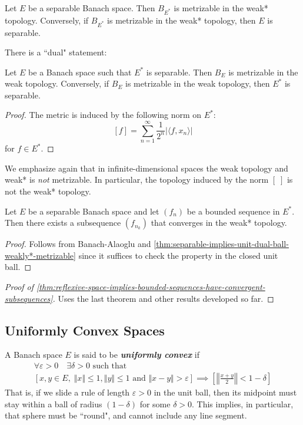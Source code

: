 \documentclass{article}
\theoremstyle{definition}
\numberwithin{equation}{section}
\begin{document}
	\begin{thm}\label{thm:separable-implies-unit-dual-ball-weakly*-metrizable}
		Let $E$ be a separable Banach space. Then $B_{E^*}$ is metrizable in the weak* topology. Conversely, if $B_{E^*}$ is metrizable in the weak* topology, then $E$ is separable.
	\end{thm}
	There is a ``dual" statement:
	\begin{thm}
		Let $E$ be a Banach space such that $E^*$ is separable. Then $B_E$ is metrizable in the weak topology. Conversely, if $B_E$ is metrizable in the weak topology,  then $E^*$ is separable.
	\end{thm}
	\begin{proof}
		The metric is induced by the following norm on $E^*$:
		\[[f]=\sum_{n=1}^\infty\frac{1}{2^n}|\langle f,x_n\rangle|\]
		for $f\in E^*$.
	\end{proof}
	\begin{remark}
		We emphasize again that in infinite-dimensional spaces the weak topology and weak* is \textit{not} metrizable. In particular, the topology induced by the norm $[\;]$ is not the weak* topology.
	\end{remark}
	\begin{coro}
		Let $E$ be a separable Banach space and let $(f_n)$ be a bounded sequence in $E^*$. Then there exists a subsequence $(f_{n_k})$ that converges in the weak* topology.
	\end{coro}
	\begin{proof}
		Follows from Banach-Alaoglu and \cref{thm:separable-implies-unit-dual-ball-weakly*-metrizable} since it suffices to check the property in the closed unit ball.
	\end{proof}
	\begin{proof}[Proof of \cref{thm:reflexive-space-implies-bounded-sequences-have-convergent-subsequences}]\label{proof:eflexive-space-implies-bounded-sequences-have-convergent-subsequences} {\color{orange} Uses the last theorem and other results developed so far.}
	\end{proof}
	\subsection{Uniformly Convex Spaces}
	A Banach space $E$ is said to be \textbf{\textit{uniformly convex}} if 
	\begin{gather*}
		\forall\varepsilon>0\quad\exists\delta>0\text{ such that}\\
		[x,y\in E,\;\Vert x\Vert\leq1,\Vert y\Vert\leq1\text{ and }\Vert x-y\Vert>\varepsilon]\implies\left[\left\Vert\frac{x+y}{2}\right\Vert<1-\delta\right]
	\end{gather*}
	That is, if we slide a rule of length $\varepsilon>0$ in the unit ball, then its midpoint must stay within a ball of radius $(1-\delta)$ for some $\delta>0$. This implies, in particular, that sphere must be ``round", and cannot include any line segment.
	
\end{document}
